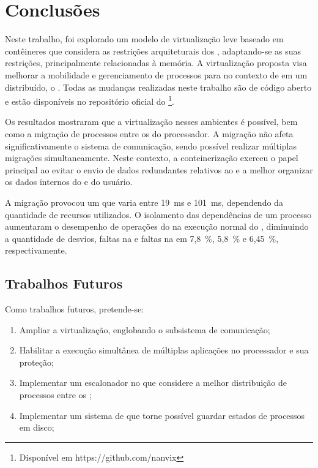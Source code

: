\glsresetall
\chapter{Conclusões}
\label{chap.conclusions}

Neste trabalho, foi explorado um modelo de virtualização leve baseado em contêineres que considera as restrições arquiteturais dos \lws, adaptando-se as suas restrições, principalmente relacionadas à memória. A virtualização proposta visa melhorar a mobilidade e gerenciamento de processos para \lws no contexto de em um \os distribuído, o \nanvix. Todas as mudanças realizadas neste trabalho são de código aberto e estão disponíveis no repositório oficial do \nanvix\footnote{Disponível em https://github.com/nanvix}.
%

Os resultados mostraram que a virtualização nesses ambientes é possível, bem como a migração de processos entre os \clusters do processador. A migração não afeta significativamente o sistema de comunicação, sendo possível realizar múltiplas migrações simultaneamente. Neste contexto, a conteinerização exerceu o papel principal ao evitar o envio de dados redundantes relativos ao  e a melhor organizar os dados internos do  e do usuário. 

A migração provocou um \downtime que varia entre 19~ms e 101~ms, dependendo da quantidade de recursos utilizados. O isolamento das dependências de um processo aumentaram o desempenho de operações do  na execução normal do \so, diminuindo a quantidade de desvios, faltas na \dcache e faltas na \icache em 7,8~\%, 5,8~\% e 6,45~\%, respectivamente.



\section{Trabalhos Futuros}
Como trabalhos futuros, pretende-se:

\begin{enumerate}[label=(\roman*)]
    \item Ampliar a virtualização, englobando o subsistema de comunicação;
    \item Habilitar a execução simultânea de múltiplas aplicações no processador e sua proteção;
    \item Implementar um escalonador no \nanvix que considere a melhor distribuição de processos entre os \clusters;
    \item Implementar um sistema de \checkpointing que torne possível guardar estados de processos em disco;
\end{enumerate}

